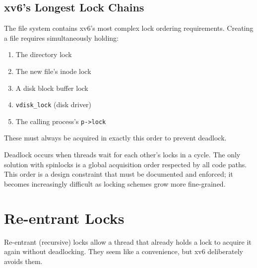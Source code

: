 \documentclass[11pt, a4paper]{article}
\begin{document}
\subsection{xv6's Longest Lock Chains}

The file system contains xv6's most complex lock ordering requirements. Creating a file requires simultaneously holding:
\begin{enumerate}[leftmargin=2em]
  \item The directory lock
  \item The new file's inode lock
  \item A disk block buffer lock
  \item \lstinline|vdisk_lock| (disk driver)
  \item The calling process's \lstinline|p->lock|
\end{enumerate}
These must always be acquired in exactly this order to prevent deadlock.

\begin{tcolorbox}[summary, title={Section Summary}]
Deadlock occurs when threads wait for each other's locks in a cycle. The only solution with spinlocks is a global acquisition order respected by all code paths. This order is a design constraint that must be documented and enforced; it becomes increasingly difficult as locking schemes grow more fine-grained.
\end{tcolorbox}

\section{Re-entrant Locks}

Re-entrant (recursive) locks allow a thread that already holds a lock to acquire it again without deadlocking. They seem like a convenience, but xv6 deliberately avoids them.
\end{document}
